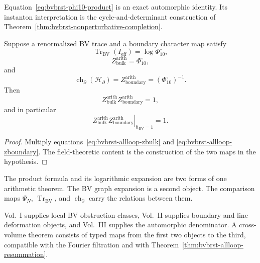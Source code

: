 \begin{remark}
\label{rem:bvbrst-allloop-nonpert-exact}
Equation~\eqref{eq:bvbrst-phi10-product} is an exact automorphic
identity.  Its instanton interpretation is the cycle-and-determinant
construction of
Theorem~\ref{thm:bvbrst-nonperturbative-completion}.
\end{remark}

\begin{conjecture}
\label{cor:bvbrst-allloop-bulk-boundary}
Suppose a renormalized BV trace and a boundary character map satisfy
\begin{equation}\label{eq:bvbrst-allloop-effective}
 \operatorname{Tr}_{\mathrm{BV}}(I_{\mathrm{eff}})
 =\log\Phi_{10}^{\circ},
\end{equation}
\begin{equation}\label{eq:bvbrst-allloop-zbulk}
 Z_{\mathrm{bulk}}^{\mathrm{arith}}=\Phi_{10}^{\circ},
\end{equation}
and
\begin{equation}\label{eq:bvbrst-allloop-zboundary}
 \operatorname{ch}_{\partial}(\mathcal H_{\partial})
 =Z_{\mathrm{boundary}}^{\mathrm{arith}}
 =(\Phi_{10}^{\circ})^{-1}.
\end{equation}
Then
\begin{equation}\label{eq:bvbrst-allloop-bulk-boundary-product}
 Z_{\mathrm{bulk}}^{\mathrm{arith}}
 Z_{\mathrm{boundary}}^{\mathrm{arith}}=1,
\end{equation}
and in particular
\begin{equation}\label{eq:bvbrst-allloop-lusztig-duality}
 \left.Z_{\mathrm{bulk}}^{\mathrm{arith}}
 Z_{\mathrm{boundary}}^{\mathrm{arith}}
 \right|_{\hbar_{\mathrm{BV}}=1}=1.
\end{equation}
\end{conjecture}

\begin{proof}
Multiply equations~\eqref{eq:bvbrst-allloop-zbulk} and
\eqref{eq:bvbrst-allloop-zboundary}.  The field-theoretic content is
the construction of the two maps in the hypothesis.
\end{proof}

\begin{remark}
\label{rem:bvbrst-allloop-multipath}
The product formula and its logarithmic expansion are two forms of one
arithmetic theorem.  The BV graph expansion is a second object.  The
comparison maps $\Psi_N$, $\operatorname{Tr}_{\mathrm{BV}}$, and
$\operatorname{ch}_{\partial}$ carry the relations between them.
\end{remark}

\begin{remark}
\label{rem:bvbrst-allloop-cross-volume}
Vol.~I supplies local BV obstruction classes, Vol.~II supplies
boundary and line deformation objects, and Vol.~III supplies the
automorphic denominator.  A cross-volume theorem consists of typed
maps from the first two objects to the third, compatible with the
Fourier filtration and with
Theorem~\ref{thm:bvbrst-allloop-resummation}.
\end{remark}
